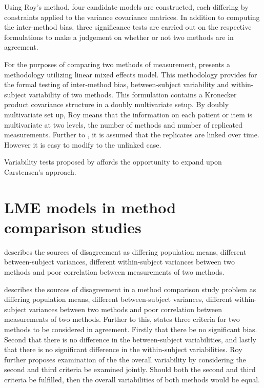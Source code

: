 \documentclass[12pt, a4paper]{report}
\theoremstyle{plain}
\theoremstyle{definition}
\theoremstyle{remark}
\begin{document}
\bigskip
Using Roy's method, four candidate models are constructed, each differing by constraints applied to the variance covariance matrices. In addition to computing the inter-method bias, three significance tests are carried out on the respective formulations to make a judgement on whether or not two methods are in agreement.
\bigskip


For the purposes of comparing two methods of measurement, \citet{ARoy2009} presents a methodology utilizing linear mixed effects model. This methodology provides for the formal testing of inter-method bias, between-subject variability and within-subject variability of two methods. This formulation contains a Kronecker product covariance structure in a doubly multivariate setup. By doubly multivariate set up, Roy means that the information on each patient or item is multivariate at two levels, the number of methods and number of replicated measurements. Further to \citet{lam}, it is assumed that the replicates are linked over time. However it is easy to modify to the unlinked case.


\bigskip
Variability tests proposed by \citet{ARoy2009} affords the opportunity to expand upon Carstensen's approach.


		\section{LME models in method comparison studies}
		\citet{Barnhart}  describes the sources of disagreement as
		differing population means, different between-subject variances,
		different within-subject variances between two methods and poor
		correlation between measurements of two methods.

		
	
		
	\citet{Barnhart} describes the sources of disagreement in a method comparison study problem as
	differing population means, different between-subject variances, different within-subject variances between two methods and poor
	correlation between measurements of two methods. Further to this, \citet{ARoy2009} states three criteria for two methods to be considered in agreement. Firstly that there be no significant bias. Second that there is no difference in the between-subject variabilities, and lastly that there is no significant difference in the within-subject variabilities. 	Roy further proposes examination of the the overall variability by considering the second and third criteria be examined jointly. Should both the second and third criteria be fulfilled, then the overall variabilities of both methods would be equal.
	
\end{document}
